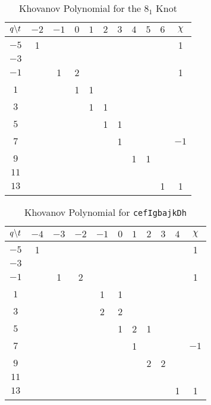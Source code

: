 \begin{table}
    \centering
    \begin{tabular}{| c | c | c | c | c | c | c | c | c | c | c |}
        \hline
        $q\symbol{92}t$&$-2$&$-1$&$0$&$1$&$2$&$3$&$4$&$5$&$6$&$\chi$\\
        \hline
        $-5$&1&&&&&&&&&1\\
        \hline
        $-3$&&&&&&&&&&\\
        \hline
        $-1$&&1&2&&&&&&&1\\
        \hline
        $1$&&&1&1&&&&&&\\
        \hline
        $3$&&&&1&1&&&&&\\
        \hline
        $5$&&&&&1&1&&&&\\
        \hline
        $7$&&&&&&1&&&&$-1$\\
        \hline
        $9$&&&&&&&1&1&&\\
        \hline
        $11$&&&&&&&&&&\\
        \hline
        $13$&&&&&&&&&1&1\\
        \hline
    \end{tabular}
    \caption{Khovanov Polynomial for the $8_{1}$ Knot}
    \label{table:m_6_kho}
\end{table}
\begin{table}
    \centering
    \begin{tabular}{| c | c | c | c | c | c | c | c | c | c | c |}
        \hline
        $q\symbol{92}t$&$-4$&$-3$&$-2$&$-1$&$0$&$1$&$2$&$3$&$4$&$\chi$\\
        \hline
        $-5$&1&&&&&&&&&1\\
        \hline
        $-3$&&&&&&&&&&\\
        \hline
        $-1$&&1&2&&&&&&&1\\
        \hline
        $1$&&&&1&1&&&&&\\
        \hline
        $3$&&&&2&2&&&&&\\
        \hline
        $5$&&&&&1&2&1&&&\\
        \hline
        $7$&&&&&&1&&&&$-1$\\
        \hline
        $9$&&&&&&&2&2&&\\
        \hline
        $11$&&&&&&&&&&\\
        \hline
        $13$&&&&&&&&&1&1\\
        \hline
    \end{tabular}
    \caption{Khovanov Polynomial for \texttt{cefIgbajkDh}}
    \label{table:cefIgbajkDh_kho}
\end{table}

